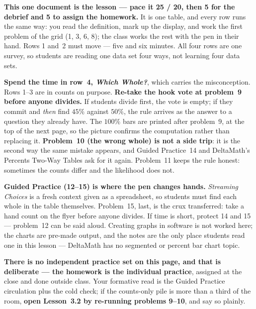 \documentclass[10pt]{article}
\begin{document}
\begin{teachernote}
\textbf{This one document is the lesson --- pace it 25 / 20, then 5 for the debrief and 5 to
assign the homework.} It is one table, and every row runs the same way: you read the definition,
mark up the display, and work the first problem of the grid (1, 3, 6, 8); the class works the
rest with the pen in their hand. Rows 1 and~2 must move --- five and six minutes. All four rows
are one survey, so students are reading one data set four ways, not learning four data sets.

\textbf{Spend the time in row~4, \emph{Which Whole?}}, which carries the misconception. Rows 1--3
are in counts on purpose. \textbf{Re-take the hook vote at problem~9 before anyone divides.} If
students divide first, the vote is empty; if they commit and \emph{then} find $45\%$ against
$50\%$, the rule arrives as the answer to a question they already have. The $100\%$ bars are
printed after problem~9, at the top of the next page, so the picture confirms the computation
rather than replacing it. \textbf{Problem~10 (the wrong whole) is not a side trip}: it is the
second way the same mistake appears, and Guided Practice~14 and DeltaMath's Percents Two-Way
Tables ask for it again. Problem~11 keeps the rule honest: sometimes the counts differ and the likelihood does not.

\textbf{Guided Practice (12--15) is where the pen changes hands.} \emph{Streaming Choices} is a
fresh context given as a spreadsheet, so students must find each whole in the table themselves.
Problem~15, last, is the crux transferred: take a hand count on the flyer before anyone divides.
If time is short, protect 14 and 15 --- problem~12 can be said aloud. Creating graphs in software
is not worked here; the charts are pre-made output, and the notes are the only place students
read one in this lesson --- DeltaMath has no segmented or percent bar chart topic.

\textbf{There is no independent practice set on this page, and that is deliberate --- the
homework is the individual practice}, assigned at the close and done outside class. Your
formative read is the Guided Practice circulation plus the cold check; if the counts-only pile is
more than a third of the room, \textbf{open Lesson~3.2 by re-running problems 9--10}, and say so
plainly.
\end{teachernote}
\end{document}
